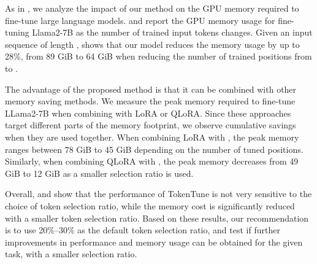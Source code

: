 As in , we analyze the impact of our method on the GPU memory required to fine-tune large language models.  and  report the GPU memory usage for fine-tuning Llama2-7B as the number of trained input tokens changes.
Given an input sequence of length ,  shows that our model reduces the memory usage by up to 28\%, from 89 GiB to 64 GiB when reducing the number of trained positions from  to . 

The advantage of the proposed method is that it can be combined with other memory saving methods. 
We measure the peak memory required to fine-tune LLama2-7B when combining \method with LoRA or QLoRA. 
Since these approaches target different parts of the memory footprint,
we observe cumulative savings when they are used together. 
When combining LoRA with \method, the peak memory ranges between 78 GiB to 45 GiB depending on the number of tuned positions. 
Similarly, when combining QLoRA with \method, the peak memory decreases from 49 GiB to 12 GiB as a smaller selection ratio is used.

Overall,  and  show that 
the performance of TokenTune is not very sensitive to the choice of token selection ratio, 
while the memory cost is significantly reduced with a smaller token selection ratio.
Based on these results, 
our recommendation is to use 20\%--30\% as the default token selection ratio, and 
test if further improvements in performance and memory usage can be obtained for the given task, with a smaller selection ratio.
